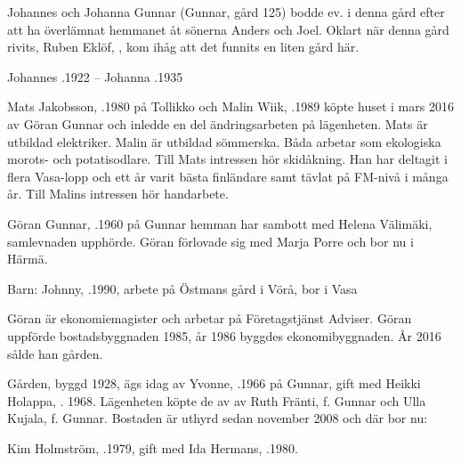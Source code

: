 

Johannes och Johanna Gunnar (Gunnar, gård 125) bodde ev. i denna gård efter att ha överlämnat hemmanet åt sönerna Anders och Joel. Oklart när denna gård rivits, Ruben Eklöf, , kom ihåg att det funnits en liten gård här.

Johannes .1922  --  Johanna .1935






Mats Jakobsson, .1980 på Tollikko och Malin Wiik, .1989 köpte huset i mars 2016 av Göran Gunnar och inledde en del ändringsarbeten på lägenheten. Mats är utbildad elektriker. Malin är utbildad sömmerska. Båda arbetar som ekologiska morots- och potatisodlare.
Till Mats intressen hör skidåkning. Han har deltagit i flera Vasa-lopp och ett år varit bästa finländare samt tävlat på FM-nivå i många år. Till Malins intressen hör handarbete.


Göran Gunnar, .1960 på Gunnar hemman har sambott med Helena Välimäki, samlevnaden upphörde. Göran förlovade sig med Marja Porre och bor nu i Härmä.

Barn: Johnny, .1990, arbete på Östmans gård i Vörå, bor i Vasa

Göran är ekonomiemagister och arbetar på Företagstjänst Adviser. Göran uppförde bostadsbyggnaden 1985, år 1986 byggdes  	ekonomibyggnaden. År 2016 sålde han gården.






Gården, byggd 1928, ägs idag av Yvonne, .1966 på Gunnar, gift med Heikki Holappa, . 1968. Lägenheten köpte de av av Ruth Fränti, f. Gunnar och Ulla Kujala, f. Gunnar. Bostaden är uthyrd sedan november 2008 och där bor nu:

Kim Holmström, .1979, gift med Ida Hermans, .1980.

